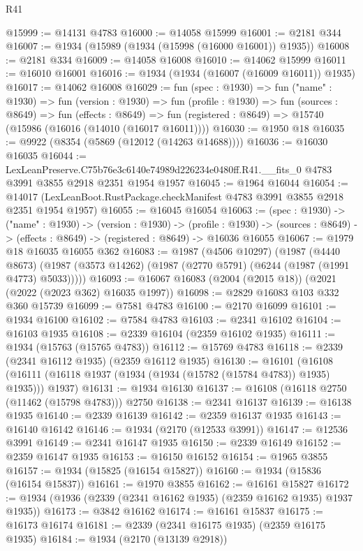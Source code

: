 \begin{lexlean}{R41}
\begin{coremodule}
@15999 := @14131 @4783
@16000 := @14058 @15999
@16001 := @2181 @344
@16007 := @1934 (@15989 (@1934 (@15998 (@16000 @16001)) @1935))
@16008 := @2181 @334
@16009 := @14058 @16008
@16010 := @14062 @15999
@16011 := @16010 @16001
@16016 := @1934 (@1934 (@16007 (@16009 @16011)) @1935)
@16017 := @14062 @16008
@16029 := fun (spec : @1930) =>
  fun ("name" : @1930) =>
  fun (version : @1930) =>
  fun (profile : @1930) =>
  fun (sources : @8649) =>
  fun (effects : @8649) =>
  fun (registered : @8649) => @15740 (@15986 (@16016 (@14010 (@16017 @16011))))
@16030 := @1950 @18
@16035 := @9922 (@8354 (@5869 (@12012 (@14263 @14688))))
@16036 := @16030 @16035
@16044 := LexLeanPreserve.C75b76e3c6140e74989d226234e0480ff.R41.__fits_0
    @4783
    @3991
    @3855
    @2918
    @2351
    @1954
    @1957
@16045 := @1964 @16044
@16054 := @14017 (LexLeanBoot.RustPackage.checkManifest @4783 @3991 @3855 @2918 @2351 @1954 @1957)
@16055 := @16045 @16054
@16063 := (spec : @1930) ->
  ("name" : @1930) ->
  (version : @1930) ->
  (profile : @1930) ->
  (sources : @8649) -> (effects : @8649) -> (registered : @8649) -> @16036 @16055
@16067 := @1979 @18 @16035 @16055 @362
@16083 := @1987
    (@4506 @10297)
    (@1987
      (@4440 @8673)
      (@1987 (@3573 @14262) (@1987 (@2770 @5791) (@6244 (@1987 (@1991 @4773) @5033)))))
@16093 := @16067 @16083 (@2004 (@2015 @18)) (@2021 (@2022 (@2023 @362) @16035 @1997))
@16098 := @2829 @16083 @103 @332 @360 @15739
@16099 := @7581 @4783
@16100 := @2170 @16099
@16101 := @1934 @16100
@16102 := @7584 @4783
@16103 := @2341 @16102
@16104 := @16103 @1935
@16108 := @2339 @16104 (@2359 @16102 @1935)
@16111 := @1934 (@15763 (@15765 @4783))
@16112 := @15769 @4783
@16118 := @2339 (@2341 @16112 @1935) (@2359 @16112 @1935)
@16130 := @16101
    (@16108 (@16111 (@16118 @1937 (@1934 (@1934 (@15782 (@15784 @4783)) @1935) @1935))) @1937)
@16131 := @1934 @16130
@16137 := @16108 (@16118 @2750 (@11462 (@15798 @4783))) @2750
@16138 := @2341 @16137
@16139 := @16138 @1935
@16140 := @2339 @16139
@16142 := @2359 @16137 @1935
@16143 := @16140 @16142
@16146 := @1934 (@2170 (@12533 @3991))
@16147 := @12536 @3991
@16149 := @2341 @16147 @1935
@16150 := @2339 @16149
@16152 := @2359 @16147 @1935
@16153 := @16150 @16152
@16154 := @1965 @3855
@16157 := @1934 (@15825 (@16154 @15827))
@16160 := @1934 (@15836 (@16154 @15837))
@16161 := @1970 @3855
@16162 := @16161 @15827
@16172 := @1934 (@1936 (@2339 (@2341 @16162 @1935) (@2359 @16162 @1935) @1937 @1935))
@16173 := @3842 @16162
@16174 := @16161 @15837
@16175 := @16173 @16174
@16181 := @2339 (@2341 @16175 @1935) (@2359 @16175 @1935)
@16184 := @1934 (@2170 (@13139 @2918))

\end{coremodule}
\end{lexlean}
